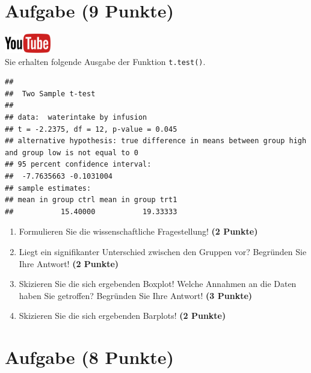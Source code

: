 \documentclass[a4paper, 10pt]{scrartcl}\usepackage[]{graphicx}\usepackage[]{xcolor}
\makeatletter
\newenvironment{kframe}{%
 \def\at@end@of@kframe{}%
 \ifinner\ifhmode%
  \def\at@end@of@kframe{\end{minipage}}%
  \begin{minipage}{\columnwidth}%
 \fi\fi%
 \def\FrameCommand##1{\hskip\@totalleftmargin \hskip-\fboxsep
 \colorbox{shadecolor}{##1}\hskip-\fboxsep
     \hskip-\linewidth \hskip-\@totalleftmargin \hskip\columnwidth}%
 \MakeFramed {\advance\hsize-\width
   \@totalleftmargin\z@ \linewidth\hsize
   \@setminipage}}%
 {\par\unskip\endMakeFramed%
 \at@end@of@kframe}
\newenvironment{knitrout}{}{} %
\makeatother
\begin{document}
\section{Aufgabe \hfill (9 Punkte)}

\hfill\href{https://youtu.be/w62HJlbN28U}{\includegraphics[width =
  2cm]{img/youtube}}\\[1Ex]

Sie erhalten folgende \Rlogo Ausgabe der Funktion \texttt{t.test()}.

\begin{knitrout}
\color{fgcolor}\begin{kframe}
\begin{verbatim}
## 
## 	Two Sample t-test
## 
## data:  waterintake by infusion
## t = -2.2375, df = 12, p-value = 0.045
## alternative hypothesis: true difference in means between group high and group low is not equal to 0
## 95 percent confidence interval:
##  -7.7635663 -0.1031004
## sample estimates:
## mean in group ctrl mean in group trt1 
##           15.40000           19.33333
\end{verbatim}
\end{kframe}
\end{knitrout}


\begin{enumerate}
  \item Formulieren Sie die wissenschaftliche Fragestellung! \textbf{(2
Punkte)}
\item Liegt ein signifikanter Unterschied zwischen den Gruppen vor?
  Begr{\"u}nden Sie Ihre Antwort! \textbf{(2 Punkte)}
\item Skizieren Sie die sich ergebenden Boxplot!
  Welche Annahmen an die Daten haben Sie getroffen? Begr{\"u}nden Sie Ihre
  Antwort! \textbf{(3 Punkte)} 
\item Skizieren Sie die sich ergebenden Barplots! \textbf{(2 Punkte)} 
\end{enumerate}
 
\clearpage

\section{Aufgabe \hfill (8 Punkte)}
\end{document}
